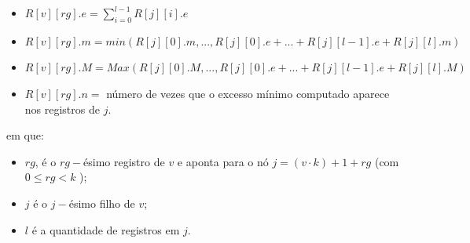\begin{itemize}
    \item $R[v][rg].e = \displaystyle{\sum_{i=0}^{l-1} R[j][i].e} $
    \item $R[v][rg].m = min(R[j][0].m, ... , R[j][0].e + ... + R[j][l-1].e + R[j][l].m )$
    \item $R[v][rg].M = Max(R[j][0].M, ... , R[j][0].e + ... + R[j][l-1].e + R[j][l].M )$
    \item $R[v][rg].n =$ número de vezes que o excesso mínimo computado aparece nos registros de  $j$.  
\end{itemize}

em que:
\begin{itemize}
    \item $rg$, é o $rg-$ésimo registro de $v$ e aponta para o nó $j =(v\cdot k)+1+rg$ (com $0 \leq rg <  k$ );
    \item $j$ é o $j-$ésimo filho de $v$;
    \item $l$ é a quantidade de registros em $j$.
\end{itemize}


